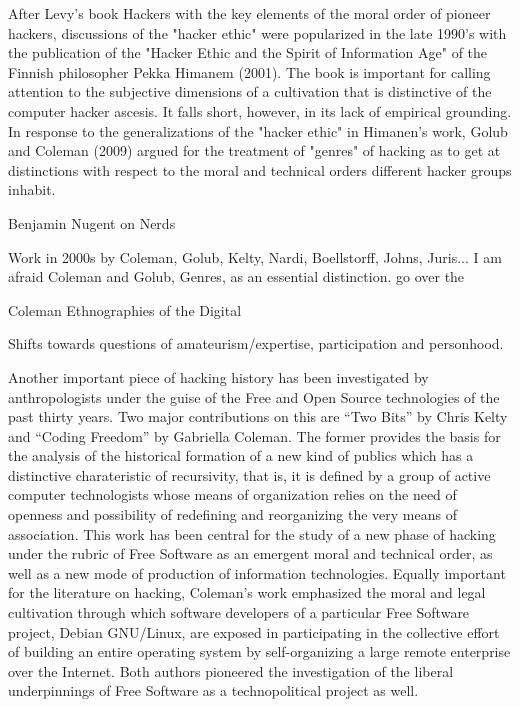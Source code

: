 \documentclass[10pt,letter,oneside]{scrartcl}
\begin{document}
After Levy's book Hackers with the key elements of the moral order of pioneer
hackers, discussions of the "hacker ethic" were popularized in the late 1990's
with the publication of the "Hacker Ethic and the Spirit of Information Age" of
the Finnish philosopher Pekka Himanem (2001). The book is important for calling
attention to the subjective dimensions of a cultivation that is distinctive of
the computer hacker ascesis.  It falls short, however, in its lack of empirical
grounding.  In response to the generalizations of the "hacker ethic" in
Himanen's work, Golub and Coleman (2009) argued for the treatment of "genres"
of hacking as to get at distinctions with respect to the moral and technical
orders different hacker groups inhabit. 


Benjamin Nugent on Nerds %

Work in 2000s by Coleman, Golub, Kelty, Nardi, Boellstorff, Johns, Juris...  %
I am afraid
Coleman and Golub, Genres, as an essential distinction.                      %
go over the

Coleman Ethnographies of the Digital

Shifts towards questions of amateurism/expertise, participation and personhood. 

Another important piece of hacking history has been investigated by
anthropologists under the guise of the Free and Open Source technologies of the
past thirty years. Two major contributions on this are ``Two Bits'' by Chris
Kelty and ``Coding Freedom'' by Gabriella Coleman. The former provides the
basis for the analysis of the historical formation of a new kind of publics
which has a distinctive charateristic of recursivity, that is, it is defined by
a group of active computer technologists whose means of organization relies on
the need of openness and possibility of redefining and reorganizing the very
means of association. This work has been central for the study of a new phase
of hacking under the rubric of Free Software as an emergent moral and technical
order, as well as a new mode of production of information technologies. Equally
important for the literature on hacking, Coleman's work emphasized the moral
and legal cultivation through which software developers of a particular Free
Software project, Debian GNU/Linux, are exposed in participating in the
collective effort of building an entire operating system by self-organizing a
large remote enterprise over the Internet. Both authors pioneered the
investigation of the liberal underpinnings of Free Software as a
technopolitical project as well.
\end{document}
